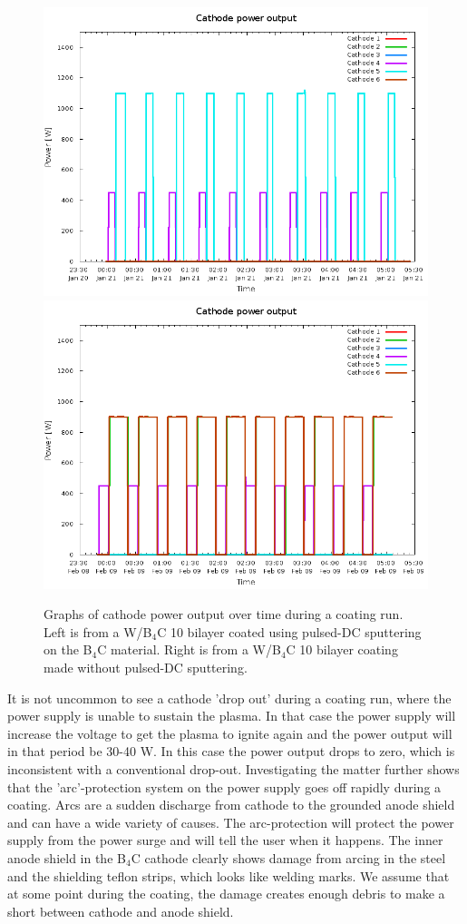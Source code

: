 \begin{figure}[!h]
	\center
	\includegraphics[width=0.47\linewidth]{figures/athena/coatings/power_output_rf_coating.png}
	\includegraphics[width=0.47\linewidth]{figures/athena/coatings/power_output_dc_coating.png}
\caption{\footnotesize Graphs of cathode power output over time during a coating run. Left is from a W/B$_4$C 10 bilayer coated using pulsed-DC sputtering on the B$_4$C material. Right is from a W/B$_4$C 10 bilayer coating made without pulsed-DC sputtering.}\label{fig:power-output}
\end{figure}

It is not uncommon to see a cathode 'drop out' during a coating run, where the power supply is unable to sustain the plasma. In that case the power supply will increase the voltage to get the plasma to ignite again and the power output will in that period be 30-40 W. In this case the power output drops to zero, which is inconsistent with a conventional drop-out. Investigating the matter further shows that the 'arc'-protection system on the power supply goes off rapidly during a coating. Arcs are a sudden discharge from cathode to the grounded anode shield and can have a wide variety of causes. The arc-protection will protect the power supply from the power surge and will tell the user when it happens. The inner anode shield in the B$_4$C cathode clearly shows damage from arcing in the steel and the shielding teflon strips, which looks like welding marks. We assume that at some point during the coating, the damage creates enough debris to make a short between cathode and anode shield.

